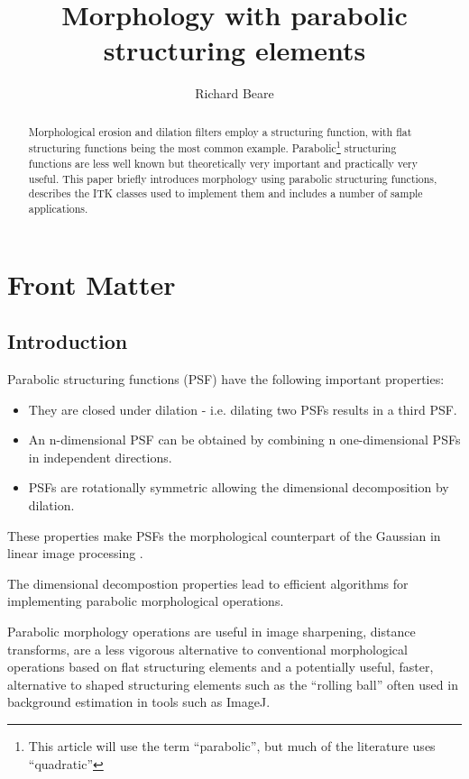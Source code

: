 \documentclass{InsightArticle}
\title{Morphology with parabolic structuring elements}
\author{Richard Beare}
\begin{document}
\maketitle

\ifhtml
\chapter*{Front Matter\label{front}}
\fi


\begin{abstract}
\noindent
Morphological erosion and dilation filters employ a structuring
function, with flat structuring functions being the most common
example. Parabolic\footnote{This article will use the term
``parabolic'', but much of the literature uses ``quadratic''}
structuring functions are less well known but theoretically very
important and practically very useful. This paper briefly introduces
morphology using parabolic structuring functions, describes the ITK
classes used to implement them and includes a number of sample
applications.
\end{abstract}

\tableofcontents

\section{Introduction}
Parabolic structuring functions (PSF) have the following important properties:
\begin{itemize}
\item They are closed under dilation - i.e. dilating two PSFs results in a third PSF.
\item An n-dimensional PSF can be obtained by combining n
one-dimensional PSFs in independent directions.
\item PSFs are rotationally symmetric allowing the dimensional
decomposition by dilation.
\end{itemize}
These properties make PSFs the morphological counterpart of the
Gaussian in linear image processing \cite{Boomgaard96}.

The dimensional decompostion properties lead to efficient algorithms
for implementing parabolic morphological operations.

Parabolic morphology operations are useful in image sharpening,
distance transforms, are a less vigorous alternative to conventional
morphological operations based on flat structuring elements and a
potentially useful, faster, alternative to shaped structuring elements
such as the ``rolling ball'' often used in background estimation in
tools such as ImageJ.
\end{document}

